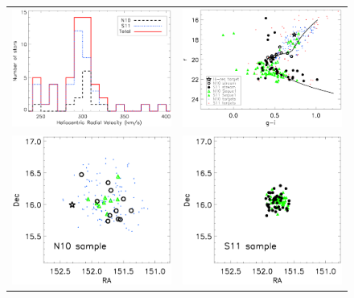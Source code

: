 \documentclass[manuscript]{aastex}
\begin{document}
\begin{figure}
 \begin{center}
  \begin{tabular}{cc}
    \includegraphics[width=8.5cm]{velhist.ps} & \includegraphics[width=8.5cm]{cm_2.ps} \\
    \includegraphics[width=8.5cm]{coord1.ps}  & \includegraphics[width=8.5cm]{coord2.ps}  \\

\end{tabular}
\end{center}
\end{figure}
\end{document}
